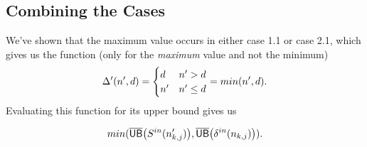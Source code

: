 \subsection*{Combining the Cases}
We've shown that the maximum value occurs in either case 1.1 or case 2.1, which gives us the function (only for the \textit{maximum} value and not the minimum)
\[
\Delta'(n',d) = \begin{cases}
d & n' > d\\
n' & n' \leq d
\end{cases} = min(n',d).
\]
Evaluating this function for its upper bound gives us

\[
	min(\overline{\mathsf{UB}}\big(S^{in}(n'_{k,j})\big), \overline{\mathsf{UB}}\big(\delta^{in}(n_{k,j})\big)).
\]


